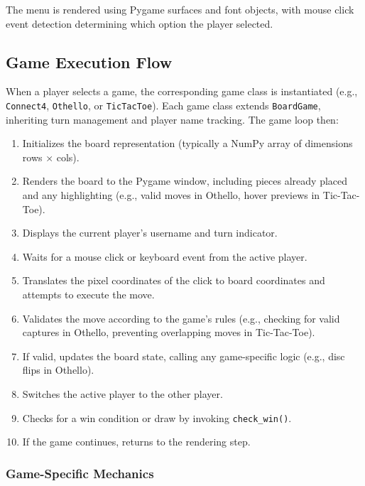\documentclass[12pt,a4paper]{article}
\begin{document}
The menu is rendered using Pygame surfaces and font objects, with mouse click event detection determining which option the player selected.

\subsection{Game Execution Flow}

When a player selects a game, the corresponding game class is instantiated (e.g., \texttt{Connect4}, \texttt{Othello}, or \texttt{TicTacToe}). Each game class extends \texttt{BoardGame}, inheriting turn management and player name tracking. The game loop then:

\begin{enumerate}
    \item Initializes the board representation (typically a NumPy array of dimensions rows × cols).
    \item Renders the board to the Pygame window, including pieces already placed and any highlighting (e.g., valid moves in Othello, hover previews in Tic-Tac-Toe).
    \item Displays the current player's username and turn indicator.
    \item Waits for a mouse click or keyboard event from the active player.
    \item Translates the pixel coordinates of the click to board coordinates and attempts to execute the move.
    \item Validates the move according to the game's rules (e.g., checking for valid captures in Othello, preventing overlapping moves in Tic-Tac-Toe).
    \item If valid, updates the board state, calling any game-specific logic (e.g., disc flips in Othello).
    \item Switches the active player to the other player.
    \item Checks for a win condition or draw by invoking \texttt{check\_win()}.
    \item If the game continues, returns to the rendering step.
\end{enumerate}

\subsubsection{Game-Specific Mechanics}
\end{document}
